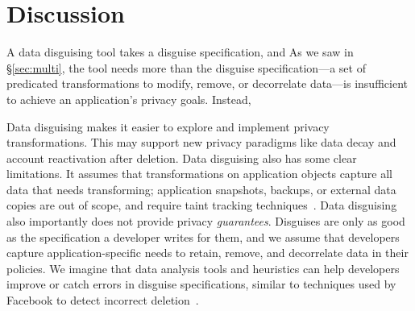 \section{Discussion}

A data disguising tool takes a disguise specification, and 
As we saw in \S\ref{sec:multi}, the tool needs more than the disguise specification---a set of predicated transformations to
modify, remove, or decorrelate data---is insufficient to achieve an application's privacy goals.
Instead, 

%
Data disguising makes it easier to explore and implement privacy transformations.
%
This may support new privacy paradigms like data decay and account reactivation after
deletion.
%
%
%
Data disguising also has some clear limitations.
%
It assumes that transformations on application objects capture all data that needs transforming;
application snapshots, backups, or external data copies are out of scope, and require
\eg taint tracking techniques~\cite{schengendb}.
Data disguising also importantly does not provide privacy \emph{guarantees}.
%
Disguises are only as good as the specification a developer writes for them, and we assume
that developers capture application-specific needs to retain, remove, and decorrelate data in
their policies.
We imagine that data analysis tools and heuristics can help developers improve or catch
errors in disguise specifications, similar to techniques used by Facebook to detect incorrect
deletion~\cite{delf}.
%
%

